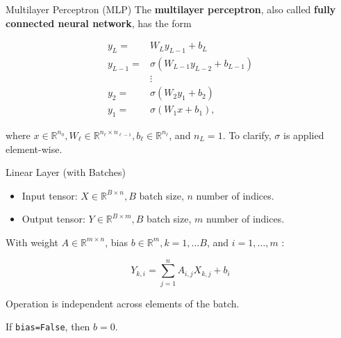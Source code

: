 \begin{frame}[allowframebreaks]
\end{frame}

\begin{frame}[allowframebreaks]

\begin{mydefinitionblock}{4.4}{Multilayer Perceptron (MLP)}
    The \textbf{multilayer perceptron}, also called \textbf{fully connected neural network}, has the form

    $$
    \begin{aligned}
    y_{L}= & W_{L} y_{L-1}+b_{L} \\
    y_{L-1}= & \sigma\left(W_{L-1} y_{L-2}+b_{L-1}\right) \\
    & \vdots \\
    y_{2}= & \sigma\left(W_{2} y_{1}+b_{2}\right) \\
    y_{1}= & \sigma\left(W_{1} x+b_{1}\right),
    \end{aligned}
    $$

    where $x \in \mathbb{R}^{n_{0}}, W_{\ell} \in \mathbb{R}^{n_{\ell} \times n_{\ell-1}}, b_{\ell} \in \mathbb{R}^{n_{\ell}}$, and $n_{L}=1$. To clarify, $\sigma$ is applied element-wise.
\end{mydefinitionblock}

\end{frame}

\begin{frame}[allowframebreaks]

\begin{mydefinitionblock}{4.5}{Linear Layer (with Batches)}
    \begin{itemize}
        \item Input tensor: $X \in \mathbb{R}^{B \times n}, B$ batch size, $n$ number of indices.
        \item Output tensor: $Y \in \mathbb{R}^{B \times m}, B$ batch size, $m$ number of indices.
    \end{itemize}

    With weight $A \in \mathbb{R}^{m \times n}$, bias $b \in \mathbb{R}^{m}, k=1, \ldots B$, and $i=1, \ldots, m$ :

    $$
    Y_{k, i}=\sum_{j=1}^{n} A_{i, j} X_{k, j}+b_{i}
    $$

    Operation is independent across elements of the batch.

    If \verb|bias=False|, then $b=0$.
\end{mydefinitionblock}

\end{frame}

